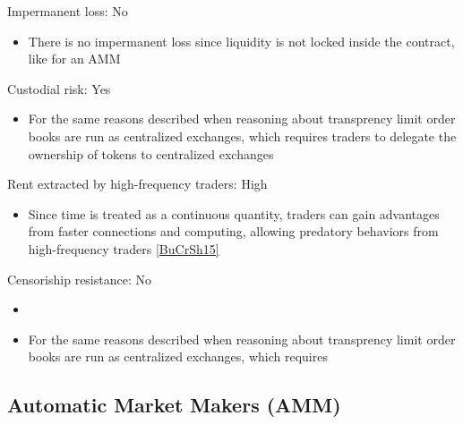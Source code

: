 \documentclass[11pt, reqno]{amsart}
\theoremstyle{definition}
\theoremstyle{remark}
\begin{document}
	\item Impermanent loss: No
	      \begin{itemize}
		      \item There is no impermanent loss since liquidity is not locked inside
                the contract, like for an AMM
	      \end{itemize}
	\item Custodial risk: Yes
	      \begin{itemize}
		      \item For the same reasons described when reasoning about transprency
                limit order books are run as centralized exchanges, which requires
                traders to delegate the ownership of tokens to centralized exchanges
	      \end{itemize}
	\item Rent extracted by high-frequency traders: High
	      \begin{itemize}
              \item Since time is treated as a continuous quantity, traders can
                gain advantages from faster connections and computing, allowing
                predatory behaviors from high-frequency traders
                \ref{BuCrSh15}
	      \end{itemize}
	\item Censoriship resistance: No
	      \begin{itemize}
              \item 
		      \item For the same reasons described when reasoning about transprency
                limit order books are run as centralized exchanges, which requires

	      \end{itemize}

\subsection{Automatic Market Makers (AMM)}
\end{document}
